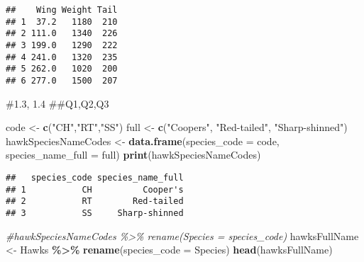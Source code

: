\documentclass[
]{article}
\newenvironment{Shaded}{\begin{snugshade}}{\end{snugshade}}
\newcommand{\AttributeTok}[1]{\textcolor[rgb]{0.13,0.29,0.53}{#1}}
\newcommand{\CommentTok}[1]{\textcolor[rgb]{0.56,0.35,0.01}{\textit{#1}}}
\newcommand{\FunctionTok}[1]{\textcolor[rgb]{0.13,0.29,0.53}{\textbf{#1}}}
\newcommand{\NormalTok}[1]{#1}
\newcommand{\OtherTok}[1]{\textcolor[rgb]{0.56,0.35,0.01}{#1}}
\newcommand{\SpecialCharTok}[1]{\textcolor[rgb]{0.81,0.36,0.00}{\textbf{#1}}}
\newcommand{\StringTok}[1]{\textcolor[rgb]{0.31,0.60,0.02}{#1}}
\begin{document}
\begin{verbatim}
##    Wing Weight Tail
## 1  37.2   1180  210
## 2 111.0   1340  226
## 3 199.0   1290  222
## 4 241.0   1320  235
## 5 262.0   1020  200
## 6 277.0   1500  207
\end{verbatim}

\#1.3, 1.4 \#\#Q1,Q2,Q3

\begin{Shaded}
\begin{Highlighting}[]
\NormalTok{code }\OtherTok{\textless{}{-}} \FunctionTok{c}\NormalTok{(}\StringTok{"CH"}\NormalTok{,}\StringTok{"RT"}\NormalTok{,}\StringTok{"SS"}\NormalTok{)}
\NormalTok{full }\OtherTok{\textless{}{-}} \FunctionTok{c}\NormalTok{(}\StringTok{"Cooper\textquotesingle{}s"}\NormalTok{, }\StringTok{"Red{-}tailed"}\NormalTok{, }\StringTok{"Sharp{-}shinned"}\NormalTok{)}
\NormalTok{hawkSpeciesNameCodes }\OtherTok{\textless{}{-}} \FunctionTok{data.frame}\NormalTok{(}\AttributeTok{species\_code =}\NormalTok{ code, }\AttributeTok{species\_name\_full =}\NormalTok{ full)}
\FunctionTok{print}\NormalTok{(hawkSpeciesNameCodes)}
\end{Highlighting}
\end{Shaded}

\begin{verbatim}
##   species_code species_name_full
## 1           CH          Cooper's
## 2           RT        Red-tailed
## 3           SS     Sharp-shinned
\end{verbatim}

\begin{Shaded}
\begin{Highlighting}[]
\CommentTok{\#hawkSpeciesNameCodes \%\textgreater{}\% rename(Species = species\_code)}
\NormalTok{hawksFullName }\OtherTok{\textless{}{-}}\NormalTok{ Hawks }\SpecialCharTok{\%\textgreater{}\%} \FunctionTok{rename}\NormalTok{(}\AttributeTok{species\_code =}\NormalTok{ Species)}
\FunctionTok{head}\NormalTok{(hawksFullName)}
\end{Highlighting}
\end{Shaded}
\end{document}
